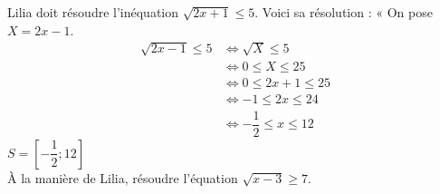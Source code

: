 {\begin{Exercice}
Lilia doit résoudre l'inéquation $ \sqrt{2x+1} \leq 5 $. Voici sa résolution :
« On pose $ X = 2x-1 $.
\begin{align*}
 \sqrt{2x-1} \leq 5 &\Leftrightarrow \sqrt{X} \leq 5 \\
 &\Leftrightarrow 0 \leq X \leq 25\\
 &\Leftrightarrow 0 \leq 2x+1 \leq 25\\
 &\Leftrightarrow -1 \leq 2x \leq 24\\
  &\Leftrightarrow -\dfrac{1}{2} \leq x \leq 12
 \end{align*}
 $ S=\left[ -\dfrac{1}{2}; 12\right]   $\\
 
À la manière de Lilia, résoudre l'équation $ \sqrt{x-3} \geq 7 $.
\end{Exercice}

}
